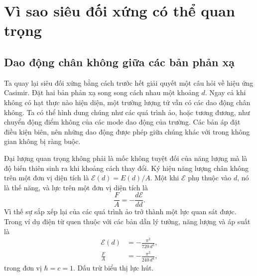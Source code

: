\chapter{Vì sao siêu đối xứng có thể quan trọng}


\section{Dao động chân không giữa các bản phản xạ}

Ta quay lại siêu đối xứng bằng cách trước hết giải quyết một câu hỏi về hiệu ứng Casimir. Đặt hai bản phản xạ song song cách nhau một khoảng \(d\). Ngay cả khi không có hạt thực nào hiện diện, một trường lượng tử vẫn có các dao động chân không. Ta có thể hình dung chúng như các quá trình ảo, hoặc tương đương, như chuyển động điểm không của các mode dao động của trường. Các bản áp đặt điều kiện biên, nên những dao động được phép giữa chúng khác với trong không gian không bị ràng buộc.

Đại lượng quan trọng không phải là mốc không tuyệt đối của năng lượng mà là độ biến thiên sinh ra khi khoảng cách thay đổi. Ký hiệu năng lượng chân không trên một đơn vị diện tích là \(\mathcal E(d)=E(d)/A\). Một khi \(\mathcal E\) phụ thuộc vào \(d\), nó là thế năng, và lực trên một đơn vị diện tích là
\begin{equation}
\frac{F}{A}=-\frac{d\mathcal E}{dd}.
\end{equation}
Vì thế sự sắp xếp lại của các quá trình ảo trở thành một lực quan sát được. Trong ví dụ điện từ quen thuộc với các bản dẫn lý tưởng, năng lượng và áp suất là
\begin{align}
\mathcal E(d)&=-\frac{\pi^2}{720\,d^3},\\
\frac{F}{A}&=-\frac{\pi^2}{240\,d^4},
\end{align}
trong đơn vị \(\hbar=c=1\). Dấu trừ biểu thị lực hút.

